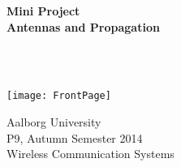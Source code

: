 \begin{center}
	\vspace*{1.5cm}
	
	\begin{Huge}
		\textbf{Mini Project\\
		Antennas and Propagation}
	\end{Huge}\\~\\
	
	\vspace*{2cm}
	
	\texttt{[image: FrontPage]}
	\vspace*{2cm}
    
	Aalborg University\\
	P9, Autumn Semester 2014\\
	Wireless Communication Systems\\
\end{center}